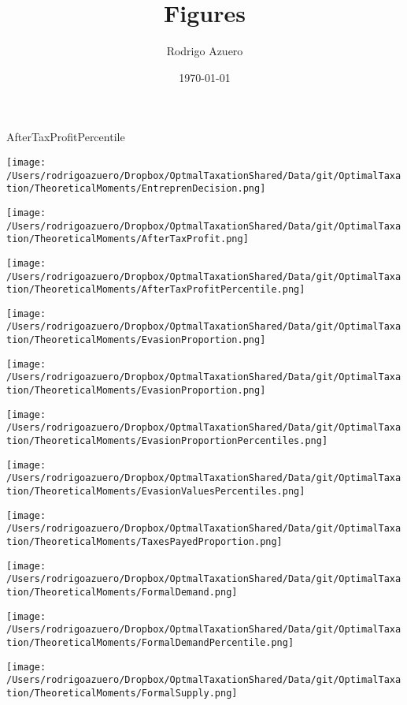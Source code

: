\documentclass[12pt]{article}
\title{\vspace{-3cm}Figures}
\author{Rodrigo Azuero}
\date{\today}
\begin{document}
\maketitle





\doublespacing
AfterTaxProfitPercentile


\texttt{[image: /Users/rodrigoazuero/Dropbox/OptmalTaxationShared/Data/git/OptimalTaxation/TheoreticalMoments/EntreprenDecision.png]}

\texttt{[image: /Users/rodrigoazuero/Dropbox/OptmalTaxationShared/Data/git/OptimalTaxation/TheoreticalMoments/AfterTaxProfit.png]}

\texttt{[image: /Users/rodrigoazuero/Dropbox/OptmalTaxationShared/Data/git/OptimalTaxation/TheoreticalMoments/AfterTaxProfitPercentile.png]}


\texttt{[image: /Users/rodrigoazuero/Dropbox/OptmalTaxationShared/Data/git/OptimalTaxation/TheoreticalMoments/EvasionProportion.png]}

\texttt{[image: /Users/rodrigoazuero/Dropbox/OptmalTaxationShared/Data/git/OptimalTaxation/TheoreticalMoments/EvasionProportion.png]}

\texttt{[image: /Users/rodrigoazuero/Dropbox/OptmalTaxationShared/Data/git/OptimalTaxation/TheoreticalMoments/EvasionProportionPercentiles.png]}

\texttt{[image: /Users/rodrigoazuero/Dropbox/OptmalTaxationShared/Data/git/OptimalTaxation/TheoreticalMoments/EvasionValuesPercentiles.png]}

\texttt{[image: /Users/rodrigoazuero/Dropbox/OptmalTaxationShared/Data/git/OptimalTaxation/TheoreticalMoments/TaxesPayedProportion.png]}

\texttt{[image: /Users/rodrigoazuero/Dropbox/OptmalTaxationShared/Data/git/OptimalTaxation/TheoreticalMoments/FormalDemand.png]}

\texttt{[image: /Users/rodrigoazuero/Dropbox/OptmalTaxationShared/Data/git/OptimalTaxation/TheoreticalMoments/FormalDemandPercentile.png]}

\texttt{[image: /Users/rodrigoazuero/Dropbox/OptmalTaxationShared/Data/git/OptimalTaxation/TheoreticalMoments/FormalSupply.png]}
\end{document}
